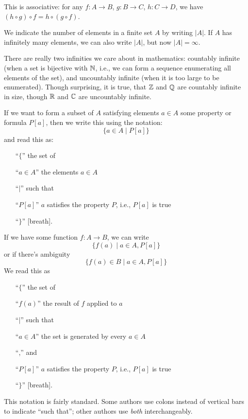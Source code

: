 This is associative: for any $f\colon A\to B$, $g\colon B\to C$,
$h\colon C\to D$, we have $(h\circ g)\circ f = h\circ(g\circ f)$.

We indicate the number of elements in a finite set $A$ by writing 
$|A|$. If $A$ has infinitely many elements, we can also write $|A|$, but
now $|A|=\infty$.

There are really two infinities we care about in mathematics: countably
infinite (when a set is bijective with $\mathbb{N}$, i.e., we can form a
sequence enumerating all elements of the set), and uncountably infinite
(when it is too large to be enumerated). Though surprising, it is true,
that $\mathbb{Z}$ and $\mathbb{Q}$ are countably infinite in size, though $\mathbb{R}$ and
$\mathbb{C}$ are uncountably infinite.

If we want to form a subset of $A$ satisfying elements $a\in A$ some
property or formula $P[a]$, then we write this using the notation:
\begin{equation}
\{a\in A\mid P[a]\}
\end{equation}
and read this as:
\begin{itemize}
\item[``$\{$''] the set of
\item[``$a\in A$''] the elements $a\in A$
\item[``$\mid$''] such that
\item[``{$P[a]$}''] $a$ satisfies the property $P$, i.e., $P[a]$ is true
\item[``$\}$''] [breath].
\end{itemize}
If we have some function $f\colon A\to B$, we can write
\begin{equation}
\{f(a)\mid a\in A, P[a]\}
\end{equation}
or if there's ambiguity
\begin{equation}
\{f(a)\in B\mid a\in A, P[a]\}
\end{equation}
We read this as
\begin{itemize}
\item[``$\{$''] the set of
\item[``$f(a)$''] the result of $f$ applied to $a$
\item[``$\mid$''] such that
\item[``$a\in A$''] the set is generated by every $a\in A$
\item[``,''] and
\item[``{$P[a]$}''] $a$ satisfies the property $P$, i.e., $P[a]$ is true
\item[``$\}$''] [breath].
\end{itemize}
This notation is fairly standard. Some authors use colons instead of
vertical bars to indicate ``such that''; other authors use \emph{both}
interchangeably.

